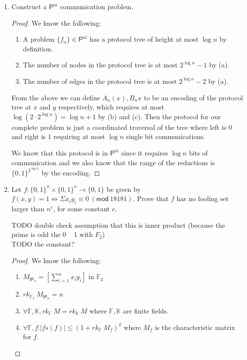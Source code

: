\documentclass[usletter]{article}
\begin{document}
\begin{enumerate}
  \item Construct a $\mathsf{P}^{\mathsf{cc}}$ communication problem.
    \begin{proof}
      We know the following:

      \begin{enumerate}
        \item A problem $\{f_n\} \in \mathsf{P}^{\mathsf{cc}}$ has a protocol tree of height at most $\log n$ by definition.
        \item The number of nodes in the protocol tree is at most $2^{\log n} - 1$ by (a).
        \item The number of edges in the protocol tree is at most $2^{\log n} - 2$ by (a).
      \end{enumerate}

      From the above we can define $A_n(x), B_n{x}$ to be an encoding of the protocol tree at $x$ and $y$ respectively, which requires at most $\log(2 \cdot 2^{\log n}) = \log n + 1$ by (b) and (c). Then the protocol for our complete problem is just a coordinated traversal of the tree where left is $0$ and right is $1$ requiring at most $\log n$ single bit communications.

      We know that this protocol is in $\mathsf{P}^{\mathsf{cc}}$ since it requires $\log n$ bits of communication and we also know that the range of the reductions is $\{0,1\}^{2^{\log n}}$ by the encoding.
    \end{proof}

  \item Let $f : \{0,1\}^n \times \{0,1\}^n \rightarrow \{0,1\}$ be given by $f(x,y) = 1 \Leftrightarrow \Sigma x_i y_i \equiv 0\ (\mathsf{mod}\ 18181)$. Prove that $f$ has no fooling set larger than $n^c$, for some constant $c$.


    TODO double check assumption that this is inner product (because the prime is odd the 0 ~ 1 with $F_2$) \\
    TODO the constant?

    \begin{proof}
      We know the following:

      \begin{enumerate}
        \item $M_{\mathsf{IP}_n} = \left [ \sum_{i=1}^{n} x_i y_i \right ]$ in $\mathbb{F}_2$
        \item $rk_{\mathbb{F}_2}\ M_{\mathsf{IP}_n} = n$
        \item $\forall \mathbb{F}, \mathbb{K}, rk_{\mathbb{F}}\ M = rk_{\mathbb{K}}\ M$ where $\mathbb{F}, \mathbb{K}$ are finite fields.
        \item $\forall \mathbb{F}, f.|fs(f)| \leq (1 + rk_{\mathbb{F}}\ M_f)^2$ where $M_f$ is the characteristic matrix for $f$.
      \end{enumerate}


\end{proof}
\end{enumerate}
\end{document}
